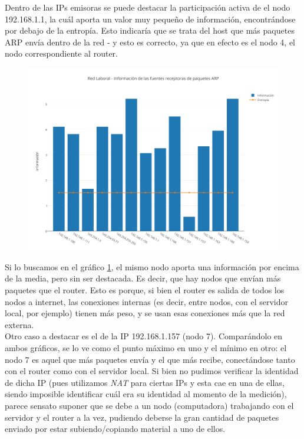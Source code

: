 Dentro de las IPs emisoras se puede destacar la participaci\'on activa de el nodo 192.168.1.1, la cu\'al aporta un valor muy pequeño de informaci\'on, encontr\'andose por debajo de la entrop\'ia. Esto indicar\'ia que se trata del host que m\'as paquetes ARP env\'ia dentro de la red - y esto es correcto, ya que en efecto es el nodo 4, el nodo correspondiente al router.\\

\begin{figure}[h!]
    \centering                                                       
    \includegraphics[width=400pt]{img/RedLaboralFuentesReceptorasARP}
    \caption{}
    \label{laboralReceptoras}
\end{figure}

Si lo buscamos en el gr\'afico \ref{laboralReceptoras}, el mismo nodo aporta una informaci\'on por encima de la media, pero sin ser destacada. Es decir, que hay nodos que env\'ian m\'as paquetes que el router. Esto es porque, si bien el router es salida de todos los nodos a internet, las conexiones internas (es decir, entre nodos, con el servidor local, por ejemplo) tienen m\'as peso, y se usan esas conexiones m\'as que la red externa.\\

Otro caso a destacar es el de la IP 192.168.1.157 (nodo 7). Compar\'andolo en ambos gr\'aficos, se lo ve como el punto m\'aximo en uno y el m\'inimo en otro: el nodo 7 es aquel que m\'as paquetes env\'ia y el que m\'as recibe, conect\'andose tanto con el router como con el servidor local. Si bien no pudimos verificar la identidad de dicha IP (pues utilizamos \textit{NAT} para ciertas IPs y esta cae en una de ellas, siendo imposible identificar cu\'al era su identidad al momento de la medici\'on), parece sensato suponer que se debe a un nodo (computadora) trabajando con el servidor y el router a la vez, pudiendo deberse la gran cantidad de paquetes enviado por estar subiendo/copiando material a uno de ellos.\\


